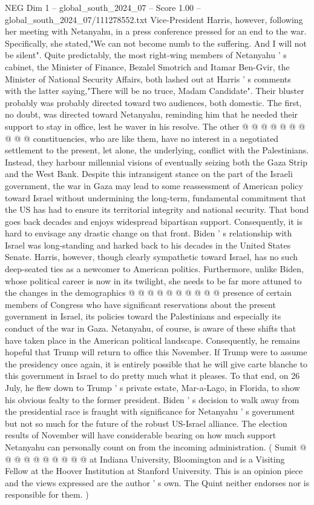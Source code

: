 \begin{textsample}{NEG Dim 1 – global\_south\_2024\_07 – Score 1.00 – global\_south\_2024\_07/111278552.txt}
Vice-President Harris, however, following her meeting with Netanyahu, in a press conference pressed for an end to the war.
Specifically, she stated,"We can not become numb to the suffering.
And I will not be silent".
Quite predictably, the most right-wing members of Netanyahu ' s cabinet, the Minister of Finance, Bezalel Smotrich and Itamar Ben-Gvir, the Minister of National Security Affairs, both lashed out at Harris ' s comments with the latter saying,"There will be no truce, Madam Candidate".
Their bluster probably was probably directed toward two audiences, both domestic.
The first, no doubt, was directed toward Netanyahu, reminding him that he needed their support to stay in office, lest he waver in his resolve.
The other @ @ @ @ @ @ @ @ @ @ constituencies, who are like them, have no interest in a negotiated settlement to the present, let alone, the underlying, conflict with the Palestinians.
Instead, they harbour millennial visions of eventually seizing both the Gaza Strip and the West Bank.
Despite this intransigent stance on the part of the Israeli government, the war in Gaza may lead to some reassessment of American policy toward Israel without undermining the long-term, fundamental commitment that the US has had to ensure its territorial integrity and national security.
That bond goes back decades and enjoys widespread bipartisan support.
Consequently, it is hard to envisage any drastic change on that front.
Biden ' s relationship with Israel was long-standing and harked back to his decades in the United States Senate.
Harris, however, though clearly sympathetic toward Israel, has no such deep-seated ties as a newcomer to American politics.
Furthermore, unlike Biden, whose political career is now in its twilight, she needs to be far more attuned to the changes in the demographics @ @ @ @ @ @ @ @ @ @ presence of certain members of Congress who have significant reservations about the present government in Israel, its policies toward the Palestinians and especially its conduct of the war in Gaza.
Netanyahu, of course, is aware of these shifts that have taken place in the American political landscape.
Consequently, he remains hopeful that Trump will return to office this November.
If Trump were to assume the presidency once again, it is entirely possible that he will give carte blanche to this government in Israel to do pretty much what it pleases.
To that end, on 26 July, he flew down to Trump ' s private estate, Mar-a-Lago, in Florida, to show his obvious fealty to the former president.
Biden ' s decision to walk away from the presidential race is fraught with significance for Netanyahu ' s government but not so much for the future of the robust US-Israel alliance.
The election results of November will have considerable bearing on how much support Netanyahu can personally count on from the incoming administration. ( Sumit @ @ @ @ @ @ @ @ @ @ at Indiana University, Bloomington and is a Visiting Fellow at the Hoover Institution at Stanford University.
This is an opinion piece and the views expressed are the author ' s own.
The Quint neither endorses nor is responsible for them. )

\end{textsample}
